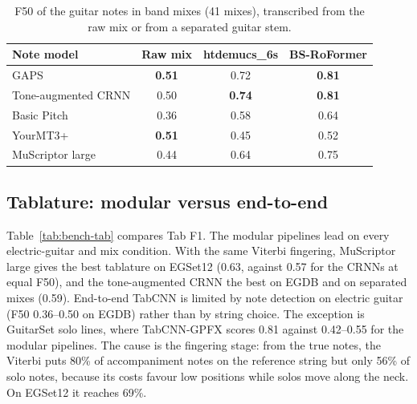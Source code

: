 \begin{table}[t]
\centering
\caption{F50 of the guitar notes in band mixes (41 mixes), transcribed from
the raw mix or from a separated guitar stem.}
\label{tab:bench-sep}
\footnotesize
\setlength{\tabcolsep}{4pt}
\begin{tabular}{@{}lccc@{}}
\toprule
Note model & Raw mix & htdemucs\_6s & BS-RoFormer \\
\midrule
GAPS & \textbf{0.51} & 0.72 & \textbf{0.81} \\
Tone-augmented CRNN & 0.50 & \textbf{0.74} & \textbf{0.81} \\
Basic Pitch & 0.36 & 0.58 & 0.64 \\
YourMT3+ & \textbf{0.51} & 0.45 & 0.52 \\
MuScriptor large & 0.44 & 0.64 & 0.75 \\
\bottomrule
\end{tabular}
\end{table}

\subsection{Tablature: modular versus end-to-end}
Table~\ref{tab:bench-tab} compares Tab F1. The modular pipelines lead on
every electric-guitar and mix condition. With the same Viterbi fingering,
MuScriptor large gives the best tablature on EGSet12 (0.63, against 0.57 for
the CRNNs at equal F50), and the tone-augmented CRNN the best on EGDB and on
separated mixes (0.59). End-to-end TabCNN is limited by note detection on
electric guitar (F50 0.36--0.50 on EGDB) rather than by string choice. The
exception is GuitarSet solo lines, where TabCNN-GPFX scores 0.81 against
0.42--0.55 for the modular pipelines. The cause is the fingering stage: from
the true notes, the Viterbi puts 80\% of accompaniment notes on the
reference string but only 56\% of solo notes, because its costs favour low
positions while solos move along the neck. On EGSet12 it reaches 69\%.

